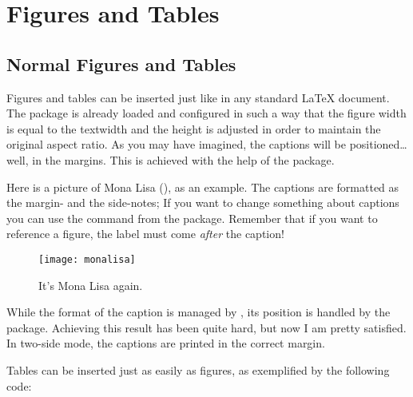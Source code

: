 \setchapterpreamble[u]{\margintoc}
\chapter{Figures and Tables}


\section{Normal Figures and Tables}

Figures and tables can be inserted just like in any standard 
\LaTeX\xspace document. The  package is already loaded 
and configured in such a way that the figure width is equal to the 
textwidth and the height is adjusted in order to maintain the original 
aspect ratio. As you may have imagined, the captions will be 
positioned\ldots well, in the margins. This is achieved with the help of 
the  package.

Here is a picture of Mona Lisa (), as an example. 
The captions are formatted as the margin- and the side-notes; If you 
want to change something about captions you can use the command 
 from the  package. Remember that if 
you want to reference a figure, the label must come \emph{after} the 
caption!

\begin{figure}[hb]
	\texttt{[image: monalisa]}
	\caption[Mona Lisa, again]{It's Mona Lisa again. \blindtext}
\end{figure}

While the format of the caption is managed by , its 
position is handled by the  package. Achieving this 
result has been quite hard, but now I am pretty satisfied. In two-side 
mode, the captions are printed in the correct margin.

Tables can be inserted just as easily as figures, as exemplified by the 
following code:

